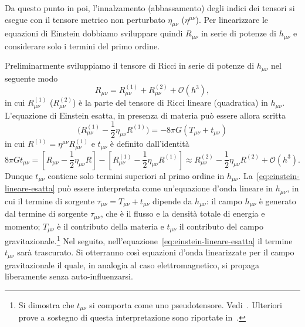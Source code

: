 Da questo punto in poi, l'innalzamento (abbassamento) degli indici dei tensori
si esegue con il tensore metrico non perturbato $\eta_{\mu\nu}$
($\eta^{\mu\nu}$).  Per linearizzare le equazioni di Einstein dobbiamo
sviluppare quindi $R_{\mu\nu}$ in serie di potenze di $h_{\mu\nu}$ e considerare
solo i termini del primo ordine.

Preliminarmente sviluppiamo il tensore di Ricci in serie di potenze di
$h_{\mu\nu}$ nel seguente modo
\begin{equation}
  R_{\mu\nu} = R_{\mu\nu}^{(1)} + R_{\mu\nu}^{(2)} + \mathcal{O}(h^{3}),
\end{equation}
in cui $R_{\mu\nu}^{(1)}$ ($R_{\mu\nu}^{(2)}$) è la parte del tensore di Ricci
lineare (quadratica) in $h_{\mu \nu}$.  L'equazione di Einstein esatta, in
presenza di materia può essere allora scritta
\begin{equation}
  \label{eq:einstein-lineare-esatta}
  \bigg(R_{\mu\nu}^{(1)} - \frac{1}{2}\eta_{\mu\nu}R^{(1)}\bigg) = -8\pi
  G(T_{\mu\nu} + t_{\mu\nu})
\end{equation}
in cui $R^{(1)} = \eta^{\mu\nu}R_{\mu\nu}^{(1)}$ e $t_{\mu\nu}$ è definito
dall'identità
\begin{equation}
  8\pi G t_{\mu\nu} = \left[ R_{\mu\nu} - \frac{1}{2}\eta_{\mu\nu} R \right]
  - \left[R_{\mu\nu}^{(1)} - \frac{1}{2}\eta_{\mu\nu}R^{(1)} \right] \approx
  R_{\mu\nu}^{(2)} - \frac{1}{2} \eta_{\mu\nu} R^{(2)} + \mathcal{O}(h^3).
\end{equation}
Dunque $t_{\mu\nu}$ contiene solo termini superiori al primo ordine in
$h_{\mu\nu}$.  La~\eqref{eq:einstein-lineare-esatta} può essere interpretata
come un'equazione d'onda lineare in $h_{\mu\nu}$, in cui il termine di sorgente
$\tau_{\mu\nu} = T_{\mu\nu} + t_{\mu\nu}$ dipende da $h_{\mu\nu}$: il campo
$h_{\mu\nu}$ è generato dal termine di sorgente $\tau_{\mu\nu}$, che è il flusso
e la densità totale di energia e momento; $T_{\mu\nu}$ è il contributo della
materia e $t_{\mu\nu}$ il contributo del campo gravitazionale.\footnote{Si
  dimostra che $t_{\mu\nu}$ si comporta come uno pseudotensore.
  Vedi~\textcite[367-374]{landau:campi}.  Ulteriori prove a sostegno di questa
  interpretazione sono riportate in~\textcite[165-171]{weinberg:gravitation}.}
Nel seguito, nell'equazione~\eqref{eq:einstein-lineare-esatta} il termine
$t_{\mu \nu}$ sarà trascurato.  Si otterranno così equazioni d'onda linearizzate
per il campo gravitazionale il quale, in analogia al caso elettromagnetico, si
propaga liberamente senza auto-influenzarsi.

